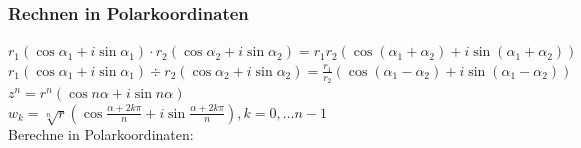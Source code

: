 \documentclass[11pt, a4paper]{article}
\begin{document}
\subsubsection{Rechnen in Polarkoordinaten}
$r_1 \left( \cos \alpha_1 + i \sin \alpha_1 \right) \cdot r_2 \left( \cos \alpha_2 + i \sin \alpha_2 \right) = r_1 r_2 \left( \cos \left(\alpha_1 + \alpha_2\right) + i \sin \left(\alpha_1 + \alpha_2\right) \right)$ \\
$r_1 \left( \cos \alpha_1 + i \sin \alpha_1 \right) \div r_2 \left( \cos \alpha_2 + i \sin \alpha_2 \right) = \frac{r_1}{r_2} \left( \cos \left(\alpha_1 - \alpha_2\right) + i \sin \left(\alpha_1 - \alpha_2\right) \right)$ \\
$z^n = r^n \left( \cos n \alpha + i \sin n \alpha \right)$ \\
$w_k = \sqrt[n]{r} \left( \cos \frac{\alpha+2k\pi}{n} + i \sin \frac{\alpha+2k\pi}{n} \right), k = 0, \dots n-1$ \\
Berechne in Polarkoordinaten:
\end{document}
